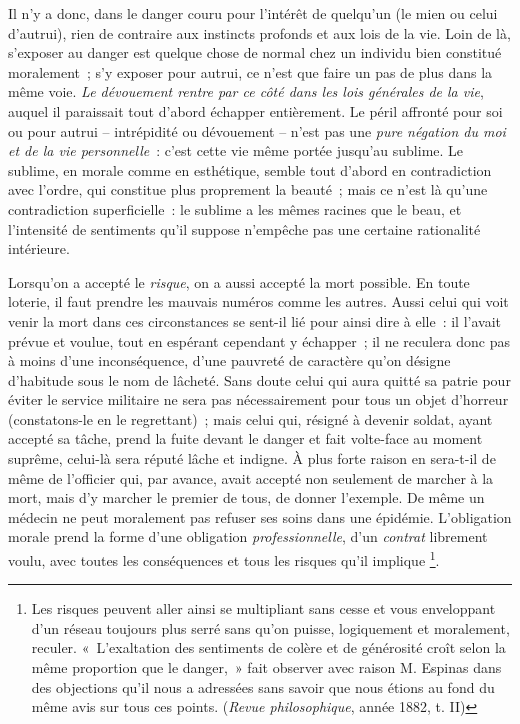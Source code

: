 \documentclass[french,twoside]{book} %
\begin{document}
Il n’y a donc, dans le danger couru pour l’intérêt de quelqu’un (le mien ou celui d’autrui), rien de contraire aux instincts profonds et aux lois de la vie. Loin de là, s’exposer au danger est quelque chose de normal chez un individu bien constitué moralement ; s’y exposer pour autrui, ce n’est que faire un pas de plus dans la même voie. \emph{Le dévouement rentre par ce côté dans les lois générales de la vie}, auquel il paraissait tout d’abord échapper entièrement. Le péril affronté pour soi ou pour autrui – intrépidité ou dévouement – n’est pas une \emph{pure négation du moi et de la vie personnelle} : c’est cette vie même portée jusqu’au sublime. Le sublime, en morale comme en esthétique, semble tout d’abord en contradiction avec l’ordre, qui constitue plus proprement la beauté ; mais ce n’est là qu’une contradiction superficielle : le sublime a les mêmes racines que le beau, et l’intensité de sentiments qu’il suppose n’empêche pas une certaine rationalité intérieure.\par
Lorsqu’on a accepté le \emph{risque}, on a aussi accepté la mort possible. En toute loterie, il faut prendre les mauvais numéros comme les autres. Aussi celui qui voit venir la mort dans ces circonstances se sent-il lié pour ainsi dire à elle : il l’avait prévue et voulue, tout en espérant cependant y échapper ; il ne reculera donc pas à moins d’une inconséquence, d’une pauvreté de caractère qu’on désigne d’habitude sous le nom de lâcheté. Sans doute celui qui aura quitté sa patrie pour éviter le service militaire ne sera pas nécessairement pour tous un objet d’horreur (constatons-le en le regrettant) ; mais celui qui, résigné à devenir soldat, ayant accepté sa tâche, prend la fuite devant le danger et fait volte-face au moment suprême, celui-là sera réputé lâche et indigne. À plus forte raison en sera-t-il de même de l’officier qui, par avance, avait accepté non seulement de marcher à la mort, mais d’y marcher le premier de tous, de donner l’exemple. De même un médecin ne peut moralement pas refuser ses soins dans une épidémie. L’obligation morale prend la forme d’une obligation \emph{professionnelle}, d’un \emph{contrat} librement voulu, avec toutes les conséquences et tous les risques qu’il implique \footnote{Les risques peuvent aller ainsi se multipliant sans cesse et vous enveloppant d’un réseau toujours plus serré sans qu’on puisse, logiquement et moralement, reculer. « L’exaltation des sentiments de colère et de générosité croît selon la même proportion que le danger, » fait observer avec raison M. Espinas dans des objections qu’il nous a adressées sans savoir que nous étions au fond du même avis sur tous ces points. (\emph{Revue philosophique}, année 1882, t. II)}.\par
\end{document}
